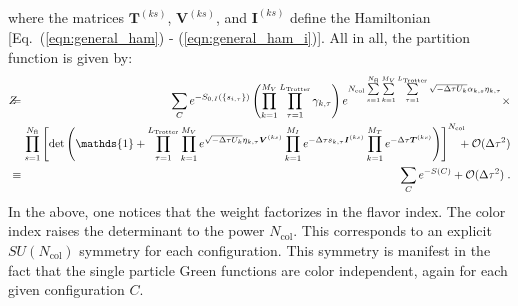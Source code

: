 \documentclass{SciPost}
\begin{document}
where the matrices $\textbf{T}^{(ks)}$,  $\textbf{V}^{(ks)}$, and  $\textbf{I}^{(ks)}$ define the Hamiltonian [Eq.~(\ref{eqn:general_ham}) - (\ref{eqn:general_ham_i})].
All in all,   the partition function is given by:
\begin{eqnarray}\label{eqn:partition_2}
    Z  \hspace{-0.7em}&=&  \hspace{-0.7em}   \sum_{C}   e^{-S_{0,I} \left( \left\{ s_{i,\tau} \right\}  \right) }     \left( \prod_{k=1}^{M_V} \prod_{\tau=1}^{L_{\mathrm{Trotter}}} \gamma_{k,\tau} \right)
    e^{ N_{\mathrm{col}}\sum\limits_{s=1}^{N_{\mathrm{fl}}} \sum\limits_{k=1}^{M_V} \sum\limits_{\tau = 1}^{L_{\mathrm{Trotter}}}\sqrt{-\Delta \tau U_k}  \alpha_{k,s} \eta_{k,\tau} } 
  \times   \nonumber \\
  \hspace{-0.7em}&\quad&  \hspace{-0.7em}
      \prod_{s=1}^{N_{\mathrm{fl}}}\left[\det\left(  \mathds{1} + 
     \prod_{\tau=1}^{L_{\mathrm{Trotter}}}   
    \prod_{k=1}^{M_V}   e^{  \sqrt{ -\Delta \tau  U_k} \eta_{k,\tau} {\bm V}^{(ks)} }   \prod_{k=1}^{M_I}   e^{  -\Delta \tau s_{k,\tau}  {\bm I}^{(ks)}}  
      \prod_{k=1}^{M_T}   e^{-\Delta \tau {\bm T}^{(ks)}}  
     \right) \right]^{N_{\mathrm{col}}} \hspace{-0.7em}+ \mathcal{O}(\Delta\tau^{2}) \nonumber\\
    \hspace{-0.7em}&\equiv&  \hspace{-0.7em}   
     \sum_{C} e^{-S(C) } + \mathcal{O}(\Delta\tau^{2})\;.
\end{eqnarray}
In the above, one notices that the weight factorizes in  the flavor index. The color index raises the determinant to the power $N_{\mathrm{col}}$. 
This corresponds to  an explicit $SU(N_{\mathrm{col}})$ symmetry   for each  configuration. This symmetry is manifest in the fact that the single particle  Green functions are color independent, again for each given  configuration $C$.
%
\end{document}
